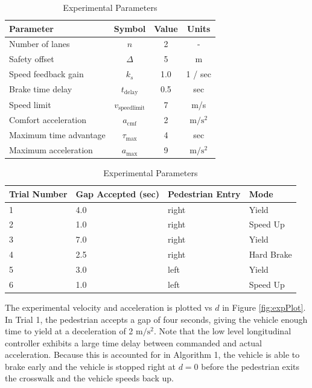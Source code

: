 \documentclass[letterpaper, 10 pt, conference]{ieeeconf} %
\begin{document}
\begin{table}[h]
\begin{center}
\caption{Experimental Parameters}\label{tb:expparams}
\begin{tabular}{lccc}
Parameter & Symbol & Value & Units \\\hline\hline
Number of lanes & $n$ & 2 & - \\
Safety offset  & $\Delta$ & 5 & m \\
Speed feedback gain & $k_s$ & 1.0 & 1 / sec\\
Brake time delay  & $t_\mathrm{delay}$ & 0.5 & sec \\ 
Speed limit & $v_\mathrm{speedlimit}$ & 7 & m/s \\
Comfort acceleration & $a_\mathrm{cmf}$ & 2 & $\mathrm{m/s^2}$ \\
Maximum time advantage & $\tau_\mathrm{max}$ & 4 & sec \\
Maximum acceleration & $a_\mathrm{max}$ & 9 & $\mathrm{m/s^2}$ \\\hline
\end{tabular}
\end{center}
\end{table}

\begin{table}[h]
\begin{center}
\caption{Experimental Parameters}\label{tb:expparams2}
\begin{tabular}{llll}
Trial Number & Gap Accepted (sec) & Pedestrian Entry & Mode\\\hline\hline
1 & 4.0 & right & Yield\\ 
2 & 1.0 & right & Speed Up\\ 
3 & 7.0 & right & Yield\\ 
4 & 2.5 & right & Hard Brake\\ 
5 & 3.0 & left & Yield \\ 
6 & 1.0 & left & Speed Up\\\hline
\end{tabular}
\end{center}
\end{table}

The experimental velocity and acceleration is plotted vs $d$ in 
Figure \ref{fig:expPlot}. In Trial 1, the pedestrian accepts a gap of four seconds, giving the vehicle enough time to yield at a deceleration of 2 $\mathrm{m/s^2}$. Note that the low level longitudinal controller exhibits a large time delay between commanded and actual acceleration. Because this is accounted for in Algorithm 1, the vehicle is able to brake early and the vehicle is stopped right at $d=0$ before the pedestrian exits the crosswalk and the vehicle speeds back up. 
\end{document}
